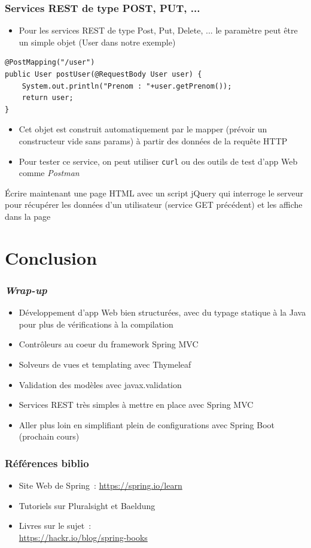 \documentclass{beamer}
\begin{document}
\begin{frame}[fragile]
	\frametitle{Services REST de type POST, PUT, ...}
	\begin{itemize}
		\item Pour les services REST de type Post, Put, Delete, ... le paramètre peut être un simple objet (User dans notre exemple)
	\end{itemize}
\begin{lstlisting}
@PostMapping("/user")
public User postUser(@RequestBody User user) {
	System.out.println("Prenom : "+user.getPrenom());
	return user;
}
\end{lstlisting}
	\begin{itemize}
		\item Cet objet est construit automatiquement par le mapper (prévoir un constructeur vide sans params) à partir des données de la requête HTTP
		\item Pour tester ce service, on peut utiliser \texttt{curl} ou des outils de test d'app Web comme \textit{Postman}
	\end{itemize}
	Écrire maintenant une page HTML avec un script jQuery qui interroge le serveur pour récupérer les données d'un utilisateur (service GET précédent) et les affiche dans la page 
\end{frame} 

\section{Conclusion}
\begin{frame}
	\frametitle{\textit{Wrap-up}}
	\begin{itemize}
		\item Développement d'app Web bien structurées, avec du typage statique à la Java pour plus de vérifications à la compilation
		\item Contrôleurs au coeur du framework Spring MVC
		\item Solveurs de vues et templating avec Thymeleaf
		\item Validation des modèles avec javax.validation
		\item Services REST très simples à mettre en place avec Spring MVC
		\item Aller plus loin en simplifiant plein de configurations avec Spring Boot (prochain cours)
	\end{itemize}
\end{frame} 

\begin{frame}
	\frametitle{Références biblio}
	\begin{itemize}
		\item Site Web de Spring~: \url{https://spring.io/learn}
		\item Tutoriels sur Pluralsight et Baeldung
		\item Livres sur le sujet~:\\
		\url{https://hackr.io/blog/spring-books}
	\end{itemize}
\end{frame} 
\end{document}
